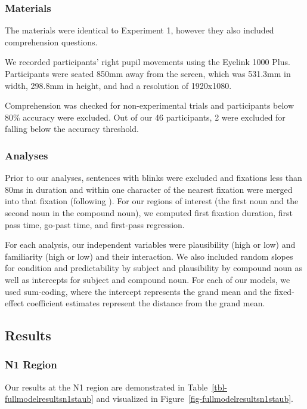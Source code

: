 \documentclass[
  12pt,
  letterpaper,
]{scrreprt}
\begin{document}
\subsubsection{Materials}\label{materials}

The materials were identical to Experiment 1, however they also included
comprehension questions.

We recorded participants' right pupil movements using the Eyelink 1000
Plus. Participants were seated 850mm away from the screen, which was
531.3mm in width, 298.8mm in height, and had a resolution of 1920x1080.

Comprehension was checked for non-experimental trials and participants
below 80\% accuracy were excluded. Out of our 46 participants, 2 were
excluded for falling below the accuracy threshold.

\subsubsection{Analyses}\label{analyses}

Prior to our analyses, sentences with blinks were excluded and fixations
less than 80ms in duration and within one character of the nearest
fixation were merged into that fixation (following
). For
our regions of interest (the first noun and the second noun in the
compound noun), we computed first fixation duration, first pass time,
go-past time, and first-pass regression.

For each analysis, our independent variables were plausibility (high or
low) and familiarity (high or low) and their interaction. We also
included random slopes for condition and predictability by subject and
plausibility by compound noun as well as intercepts for subject and
compound noun. For each of our models, we used sum-coding, where the
intercept represents the grand mean and the fixed-effect coefficient
estimates represent the distance from the grand mean.

\subsection{Results}\label{results-2}

\subsubsection{N1 Region}\label{n1-region}

Our results at the N1 region are demonstrated in
Table~\ref{tbl-fullmodelresultsn1staub} and visualized in
Figure~\ref{fig-fullmodelresultsn1staub}.
\end{document}
